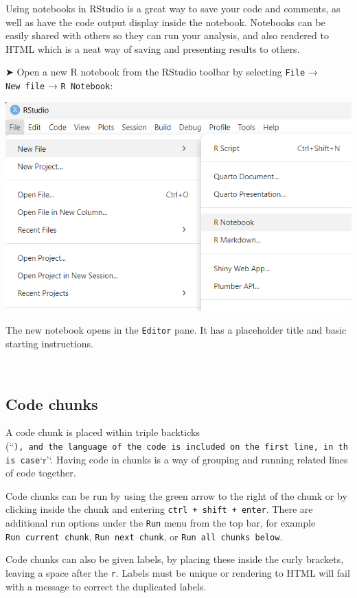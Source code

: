 \documentclass[
]{book}
\begin{document}
Using notebooks in RStudio is a great way to save your code and comments, as well as have the code output display inside the notebook. Notebooks can be easily shared with others so they can run your analysis, and also rendered to HTML which is a neat way of saving and presenting results to others.

➤ Open a new R notebook from the RStudio toolbar by selecting \texttt{File} → \texttt{New\ file} → \texttt{R\ Notebook}:

\includegraphics[width=1\textwidth,height=\textheight]{images/rstudio-new-notebook.png}

The new notebook opens in the \texttt{Editor} pane. It has a placeholder title and basic starting instructions.

~

\hypertarget{code-chunks}{%
\subsection{Code chunks}\label{code-chunks}}

A code chunk is placed within triple backticks (``\texttt{),\ and\ the\ language\ of\ the\ code\ is\ included\ on\ the\ first\ line,\ in\ this\ case}`r'`. Having code in chunks is a way of grouping and running related lines of code together.

Code chunks can be run by using the green arrow to the right of the chunk or by clicking inside the chunk and entering \texttt{ctrl\ +\ shift\ +\ enter}. There are additional run options under the \texttt{Run} menu from the top bar, for example \texttt{Run\ current\ chunk}, \texttt{Run\ next\ chunk}, or \texttt{Run\ all\ chunks\ below}.

Code chunks can also be given labels, by placing these inside the curly brackets, leaving a space after the \texttt{\textquotesingle{}r\textquotesingle{}}. Labels must be unique or rendering to HTML will fail with a message to correct the duplicated labels.
\end{document}
